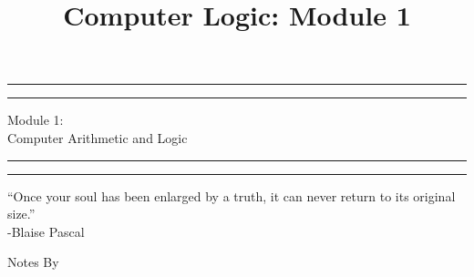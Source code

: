\documentclass[12pt, a4paper]{report}
\date{} %
\title{Computer Logic: Module 1}
\begin{document}
	\begin{titlepage} %
		
		\centering %
		
		\scshape %
		
		\vspace*{\baselineskip} %
		
		
		\rule{\textwidth}{1.6pt}\vspace*{-\baselineskip}\vspace*{2pt} %
		\rule{\textwidth}{0.4pt} %
		
		\vspace{0.75\baselineskip} %
		
		{\LARGE Module 1: \\Computer Arithmetic and Logic} %
		
		\vspace{0.75\baselineskip} %
		
		\rule{\textwidth}{0.4pt}\vspace*{-\baselineskip}\vspace{3.2pt} %
		\rule{\textwidth}{1.6pt} %
		
		\vspace{2\baselineskip} %
		
		
		“Once your soul has been enlarged by a truth, it can never return to its original size.”\\
		-Blaise Pascal%
		
		\vspace*{3\baselineskip} %
		
		
		Notes By
		
		\vspace{0.5\baselineskip} %
		

\end{titlepage}
\end{document}
